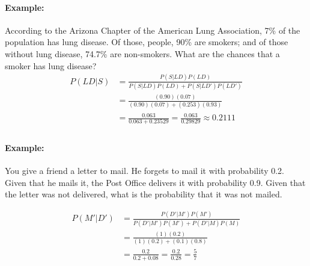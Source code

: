 \paragraph*{Example:}
According to the Arizona Chapter of the American Lung Association, 7\% of the population has lung disease. Of those,
people, 90\% are smokers; and of those without lung disease, 74.7\% are non-smokers. What are the chances that a smoker has 
lung disease?
\begin{align*}
    P(LD|S) &= \frac{P(S|LD)P(LD)}{P(S|LD)P(LD) + P(S|LD')P(LD')} \\
    &= \frac{(0.90)(0.07)}{(0.90)(0.07) + (0.253)(0.93)} \\
    &= \frac{0.063}{0.063 + 0.23529} = \frac{0.063}{0.29829} \approx 0.2111 \\
\end{align*}

\paragraph*{Example:}
You give a friend a letter to mail. He forgets to mail it with probability 0.2. Given that he mails it, 
the Post Office delivers it with probability 0.9. Given that the letter was not delivered, what is the probability
that it was not mailed.

\begin{align*}
    P(M'|D') &= \frac{P(D'|M')P(M')}{P(D'|M')P(M') + P(D'|M)P(M)} \\
    &= \frac{(1)(0.2)}{(1)(0.2) + (0.1)(0.8)} \\
    &= \frac{0.2}{0.2 + 0.08} = \frac{0.2}{0.28} = \frac{5}{7} \\
\end{align*}